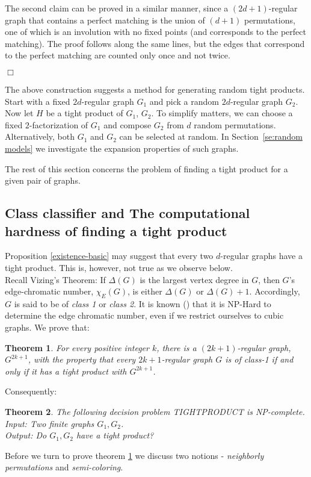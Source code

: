 \documentclass[12pt]{article}
\newtheorem{theorem}{Theorem}[section]
\newtheorem{open question}[theorem]{Open question}
\newcommand{\proofbox}{\begin{flushright}$\Box$\end{flushright}}
\begin{document}
The second claim can be proved in a similar manner, since a $(2d+1)$-regular
graph that contains a perfect matching is the union of $(d+1)$ permutations,
one of which is an involution with
no fixed points (and corresponds to the perfect matching). The proof follows along the same lines, but the edges that
correspond to the perfect matching are counted only once and not twice.
\proofbox

The above construction suggests a method for generating random
tight products. Start with a fixed $2d$-regular graph $G_1$ and 
pick a random $2d$-regular graph $G_2$. Now let $H$ be a tight product of $G_1$, $G_2$. 
To simplify matters, we can choose a fixed $2$-factorization of $G_1$ and compose $G_2$ from $d$ random permutations.
Alternatively, both $G_1$ and $G_2$ can be selected at random. In Section~\ref{se:random models} we investigate
the expansion properties of such graphs.

The rest of this section concerns
the problem of finding a tight product for a given pair of graphs.

\subsection{Class classifier and The computational hardness of finding a tight product}\label{hardness}
Proposition \ref{existence-basic} may suggest that every two $d$-regular graphs have a tight product. 
This is, however, not true as we observe below.\\
Recall Vizing's Theorem: If $\Delta(G)$ is the
largest vertex degree in $G$, then $G$'s edge-chromatic number, $\chi_E(G)$, is either $\Delta(G)$ or $\Delta(G)+1$.
Accordingly, $G$ is said to be of {\em class 1} or {\em class 2}.
It is known (\cite{Hol81}) that it is NP-Hard to determine the edge chromatic number, even if we restrict ourselves to cubic graphs. We prove that:
\begin{theorem}\label{theorem-class-classifier}
For every positive integer $k$, there is a $(2k+1)$-regular graph, $G^{2k+1}$, with the property that every $2k+1$-regular graph $G$ is of class-1 if and only if it has a tight product with $G^{2k+1}$. 
\end{theorem}
Consequently:
\begin{theorem}
The following decision problem TIGHTPRODUCT is NP-complete.\\
Input: Two finite graphs $G_1, G_2$.\\
Output: Do $G_1, G_2$ have a tight product?
\end{theorem}
Before we turn to prove theorem \ref{theorem-class-classifier} we discuss two notions - {\em neighborly permutations} and {\em semi-coloring}.
\end{document}
